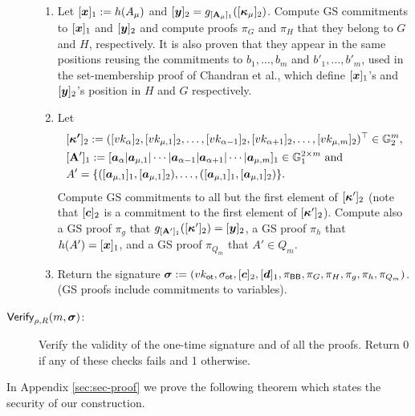 \begin{description}
\begin{enumerate}
\item Let $[{\boldsymbol{x}}]_1:=h(A_\mu)$ and $[{\boldsymbol{y}}]_2=g_{[\mathbf{{A}}_\mu]_1}([{\boldsymbol{\kappa}}_\mu]_2)$. Compute GS commitments to $[{\boldsymbol{x}}]_1$ and $[{\boldsymbol{y}}]_2$ and compute proofs $\pi_G$ and $\pi_H$ that they belong to $G$ and $H$, respectively. It is also proven that they appear in the same positions reusing the commitments to $b_1,\ldots,b_{m}$ and $b'_1,\ldots,b'_{m}$, used in the set-membership proof of Chandran et al., which define $[{\boldsymbol{x}}]_1$'s and $[{\boldsymbol{y}}]_2$'s position in $H$ and $G$ respectively.

\item Let
\begin{align*}
&[{\boldsymbol{\kappa'}}]_2:=([vk_\alpha]_2,[vk_{\mu,1}]_2,\ldots,[vk_{\alpha-1}]_2,[vk_{\alpha+1}]_2,\ldots,[vk_{\mu,m}]_2)^\top\in\mathbb{G}^m_2,\\
&[\mathbf{{A}}']_1:=[{\boldsymbol{a}}_\alpha | {\boldsymbol{a}}_{\mu,1} | \cdots | {\boldsymbol{a}}_{\alpha-1}| {\boldsymbol{a}}_{\alpha+1}|\cdots|{\boldsymbol{a}}_{\mu,m}]_1\in\mathbb{G}^{2\times m}_1\text{ and}\\
&A'=\{([{\boldsymbol{a}}_{\mu,1}]_1,[{\boldsymbol{a}}_{\mu,1}]_2),\ldots,([{\boldsymbol{a}}_{\mu,1}]_1,[{\boldsymbol{a}}_{\mu,1}]_2)\}.
\end{align*}
Compute GS commitments to all but the first element of $[{\boldsymbol{\kappa}}']_2$ (note that $[{\boldsymbol{c}}]_2$ is a commitment to the first element of $[{\boldsymbol{\kappa}}']_2$). Compute also a GS proof $\pi_g$ that $g_{[\mathbf{{A}}']_1}([{\boldsymbol{\kappa}}']_2)=[{\boldsymbol{y}}]_2$, a GS proof $\pi_{h}$ that $h(A')=[{\boldsymbol{x}}]_1$, and a GS proof $\pi_{Q_m}$ that $A'\in Q_m$.

\item Return the signature ${\boldsymbol \sigma}:=(vk_\mathsf{ot},\sigma_\mathsf{ot},[{\boldsymbol{c}}]_2,[{\boldsymbol{d}}]_1,\pi_{\mathsf{BB}},\pi_G,\pi_H, \pi_g,\pi_h,\pi_{Q_m})$. (GS proofs include commitments to variables).
\end{enumerate}

\item[$\mathsf{Verify}_{\rho,R}(m,{\boldsymbol \sigma})$:] Verify the validity of the one-time signature and of all the proofs. Return 0 if any of these checks fails and 1 otherwise.
\end{description}

In Appendix \ref{sec:sec-proof} we prove the following theorem which states the security of our construction.

